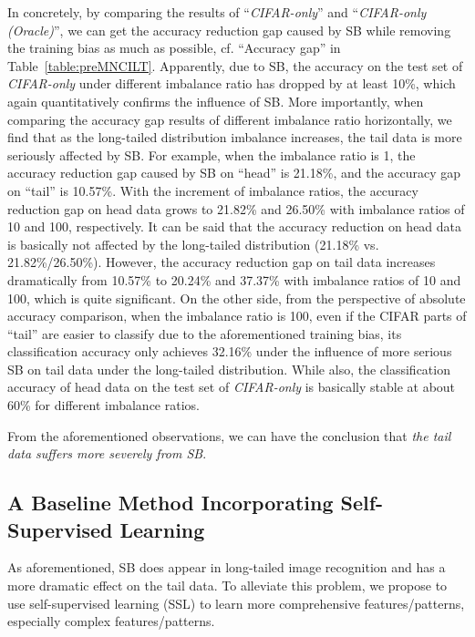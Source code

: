 \documentclass[10pt,journal,compsoc]{IEEEtran}
\begin{document}
In concretely, by comparing the results of ``\emph{CIFAR-only}'' and ``\emph{CIFAR-only (Oracle)}'', we can get the accuracy reduction gap caused by SB while removing the training bias as much as possible, cf. ``Accuracy gap'' in Table~\ref{table:preMNCILT}. Apparently, due to SB, the accuracy on the test set of \emph{CIFAR-only} under different imbalance ratio has dropped by at least 10\%, which again quantitatively confirms the influence of SB. More importantly, when comparing the accuracy gap results of different imbalance ratio horizontally, we find that as the long-tailed distribution imbalance increases, the tail data is more seriously affected by SB. For example, when the imbalance ratio is 1, the accuracy reduction gap caused by SB on ``head'' is 21.18\%, and the accuracy gap on ``tail'' is 10.57\%. With the increment of imbalance ratios, the accuracy reduction gap on head data grows to 21.82\% and 26.50\% with imbalance ratios of 10 and 100, respectively. It can be said that the accuracy reduction on head data is basically not affected by the long-tailed distribution (21.18\% vs. 21.82\%/26.50\%). However, the accuracy reduction gap on tail data increases dramatically from 10.57\% to 20.24\% and 37.37\% with imbalance ratios of 10 and 100, which is quite significant. On the other side, from the perspective of absolute accuracy comparison, when the imbalance ratio is 100, even if the CIFAR parts of ``tail'' are easier to classify due to the aforementioned training bias, its classification accuracy only achieves 32.16\% under the influence of more serious SB on tail data under the long-tailed distribution. While also, the classification accuracy of head data on the test set of \emph{CIFAR-only} is basically stable at about 60\% for different imbalance ratios.

From the aforementioned observations, we can have the conclusion that \emph{the tail data suffers more severely from SB}.


\subsection{A Baseline Method Incorporating Self-Supervised Learning}\label{sec:SSLbaseline}

As aforementioned, SB does appear in long-tailed image recognition and has a more dramatic effect on the tail data. To alleviate this problem, we propose to use self-supervised learning (SSL) to learn more comprehensive features/patterns, especially complex features/patterns.
\end{document}
